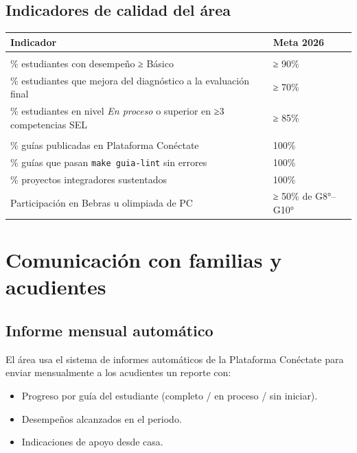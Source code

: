 \documentclass[12pt, a4paper]{article}
\begin{document}
\subsection{Indicadores de calidad del área}

\begin{center}
\begin{tabular}{|L{8cm}|L{4cm}|}
\hline
{}
\color{white}\textbf{Indicador} &
\color{white}\textbf{Meta 2026} \\
\hline
{} \\
\hline
\% estudiantes con desempeño ≥ Básico & ≥ 90\% \\
\hline
\% estudiantes que mejora del diagnóstico a la evaluación final & ≥ 70\% \\
\hline
\% estudiantes en nivel \textit{En proceso} o superior en ≥3 competencias SEL & ≥ 85\% \\
\hline
{} \\
\hline
\% guías publicadas en Plataforma Conéctate & 100\% \\
\hline
\% guías que pasan \texttt{make guia-lint} sin errores & 100\% \\
\hline
\% proyectos integradores sustentados & 100\% \\
\hline
Participación en Bebras u olimpiada de PC & ≥ 50\% de G8°–G10° \\
\hline
\end{tabular}
\end{center}

\section{Comunicación con familias y acudientes}

\subsection{Informe mensual automático}

El área usa el sistema de informes automáticos de la Plataforma Conéctate para
enviar mensualmente a los acudientes un reporte con:

\begin{itemize}
  \item Progreso por guía del estudiante (completo / en proceso / sin iniciar).
  \item Desempeños alcanzados en el periodo.
  \item Indicaciones de apoyo desde casa.
\end{itemize}
\end{document}
